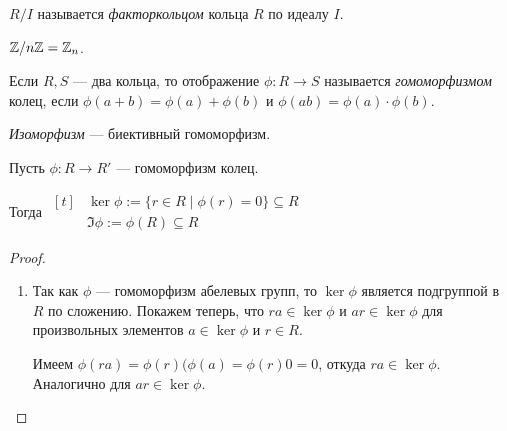 \begin{comment}
    $R/I$ --- кольцо.
\end{comment}


\begin{definition}
    $R/I$ называется \textit{факторкольцом} кольца $R$ по идеалу $I$.
\end{definition}

\begin{example}
    $\mathbb{Z} / n \mathbb{Z} = \mathbb{Z}_n$.
\end{example}

\begin{definition}
    Если $R, S$ --- два кольца, то отображение $\phi \colon R \to S$ называется \textit{гомоморфизмом} колец, если $\phi(a + b) = \phi(a) + \phi(b)$ и $\phi(ab) = \phi(a) \cdot \phi(b)$.
\end{definition}

\textit{Изоморфизм} --- биективный гомоморфизм.

\bigskip
Пусть $\phi \colon R \to R'$ --- гомоморфизм колец.

Тогда 
\begin{math}
    \begin{aligned}[t]
        &\ker \phi := \{r \in R \mid \phi (r) = 0\} \subseteq R \\
        &\Im \phi := \phi(R) \subseteq R
    \end{aligned}
\end{math}

\begin{comment}~
    \begin{enumerate}[nosep]
    \item $\ker \phi \lhd R$;
    \item $\Im \phi$ --- подкольцо в $R'$.
    \end{enumerate}
\end{comment}

\begin{proof}~
    \begin{enumerate}
    \item 
        Так как $\phi$ --- гомоморфизм абелевых групп, то $\ker \phi$ является подгруппой в $R$ по сложению. Покажем теперь, что $ra \in \ker \phi$ и $ar \in \ker \phi$ для произвольных элементов $a \in \ker \phi$ и $r \in R$.

        Имеем $\phi(ra) = \phi(r)(\phi(a) = \phi(r) 0 = 0$, откуда $ra \in \ker \phi$. Аналогично для $ar \in \ker \phi$.
    \end{enumerate}
\end{proof}

